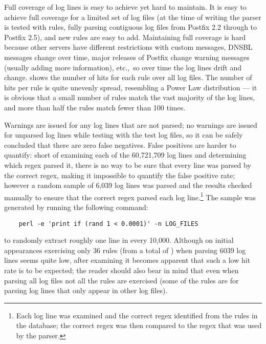 Full coverage of log lines is easy to achieve yet hard to maintain.  It is
easy to achieve full coverage for a limited set of log files (at the time
of writing the parser is tested with \numberOFrules{} rules, fully parsing
\numberOFlogFILESall{} contiguous log files from Postfix 2.2 through to
Postfix 2.5), and new rules are easy to add.  Maintaining full coverage is
hard because other servers have different restrictions with custom
messages, \gls{DNSBL} messages change over time, major releases of Postfix
change warning messages (usually adding more information), etc.,\ so over
time the log lines drift and change.   shows the
number of hits for each rule over all \numberOFlogFILES{} log files.  The
number of hits per rule is quite unevenly spread, resembling a Power Law
distribution --- it is obvious that a small number of rules match the vast
majority of the log lines, and more than half the rules match fewer than
100 times.


Warnings are issued for any log lines that are not parsed; no warnings are
issued for unparsed log lines while testing with the \numberOFlogFILES{}
test log files, so it can be safely concluded that there are zero false
negatives.  False positives are harder to quantify: short of examining each
of the 60,721,709 log lines and determining which regex parsed it, there
is no way to be sure that every line was parsed by the correct regex,
making it impossible to quantify the false positive rate; however a random
sample of 6,039 log lines was parsed and the results checked manually to
ensure that the correct regex parsed each log line.\footnote{Each log
line was examined and the correct regex identified from the
\numberOFrules{} rules in the database; the correct regex was then
compared to the regex that was used by the parser.}  The sample was
generated by running the following command:

\verb!    perl -e 'print if (rand 1 < 0.0001)' -n LOG_FILES!

\noindent{}to randomly extract roughly one line in every 10,000.  Although
on initial appearances exercising only 36 rules (from a total of
\numberOFrules{}) when parsing 6039 log lines seems quite low, after
examining  it becomes apparent that such
a low hit rate is to be expected; the reader should also bear in mind that
even when parsing all \numberOFlogFILES{} log files not all the rules are
exercised (some of the rules are for parsing log lines that only appear in
other log files).

